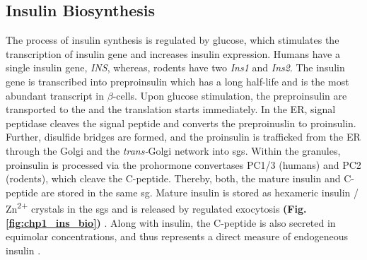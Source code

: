 \subsection{Insulin Biosynthesis} %
\label{sec:insbio}

The process of insulin synthesis is regulated by glucose, which stimulates the transcription of insulin gene and increases insulin  expression. Humans have a single insulin gene, \textit{INS}, whereas, rodents have two \textit{Ins1} and \textit{Ins2}. The insulin gene is transcribed into preproinsulin  which has a long half-life and is the most abundant transcript in $\beta$-cells. Upon glucose stimulation, the preproinsulin  are transported to the  and the translation starts immediately. In the ER, signal peptidase cleaves the signal peptide and converts the preproinuslin to proinsulin. Further, disulfide bridges are formed, and the proinsulin is trafficked from the ER through the Golgi and the \textit{trans-}Golgi network into \glspl{sg}. Within the granules, proinsulin is processed via the prohormone convertases PC1/3 (humans) and PC2 (rodents), which cleave the C-peptide. Thereby, both, the mature insulin and C-peptide are stored in the same \gls{sg}. Mature insulin is stored as hexameric insulin / Zn\textsuperscript{2+} crystals in the \glspl{sg} and is released by regulated exocytosis \textbf{(Fig. \ref{fig:chp1_ins_bio})} \textbf{\cite{vasiljevic_making_2020,tokarz_cell_2018}}. Along with insulin, the C-peptide is also secreted in equimolar concentrations, and thus represents a direct measure of endogeneous insulin \textbf{\cite{venugopal_biochemistry_2024}}. 

